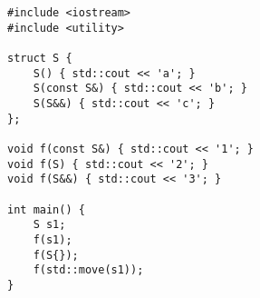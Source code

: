 \begin{lstlisting}[title=\href{https://godbolt.org/z/MN9mQM}{\texttt{godbolt.org/z/MN9mQM}}]
#include <iostream>
#include <utility>

struct S {
    S() { std::cout << 'a'; }
    S(const S&) { std::cout << 'b'; }
    S(S&&) { std::cout << 'c'; }
};

void f(const S&) { std::cout << '1'; }
void f(S) { std::cout << '2'; }
void f(S&&) { std::cout << '3'; }

int main() {
    S s1;
    f(s1);
    f(S{});
    f(std::move(s1));
}
\end{lstlisting}
